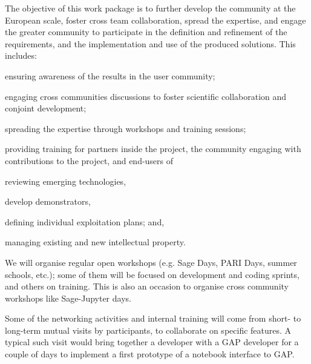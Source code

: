 
\begin{workpackage}[id=dissem,wphases=0-48!.5,
  short={Community Building/Dissemination},
  title={Community Building, Training, Dissemination, Exploitation, and Outreach},
  lead=PS,
  PSRM=9,
  SARM=18,
  USORM=1, %
  XFELRM=21, %
  USHRM=46,  %
  USRM=30,
  UVRM=2,
  UKRM=2,
  UBRM=19,
  SRRM=2,
  LLRM=6,
  UGRM=1
]

\begin{wpobjectives}
  The objective of this work package is to further develop the community at the
  European scale, foster cross team collaboration, spread the
  expertise, and engage the greater community to participate in the
  definition and refinement of the requirements, and the implementation and use of the
  produced solutions. This includes:
  \begin{compactitem}
  \item ensuring awareness of the results in the user community;
  \item engaging cross communities discussions to foster scientific collaboration and conjoint development;
  \item spreading the expertise through workshops and training sessions;
  \item providing training for partners inside the project, the
    community engaging with contributions to the project, and
    end-users of \TheProject
  \item reviewing emerging technologies,
  \item develop demonstrators,
  \item defining individual exploitation plans; and,
  \item managing existing and new intellectual property.
  \end{compactitem}
\end{wpobjectives}

\begin{wpdescription}
  We will organise regular open workshops (e.g. Sage Days, PARI Days,
  summer schools, etc.); some of them will be focused on development
  and coding sprints, and others on training. This is also an occasion
  to organise cross community workshops like Sage-Jupyter days.

  Some of the networking activities and internal training will come
  from short- to long-term mutual visits by participants, to
  collaborate on specific features. A typical such visit would bring
  together a \Jupyter developer with a GAP developer for a couple of
  days to implement a first prototype of a notebook interface to GAP.


\end{wpdescription}
\end{workpackage}
